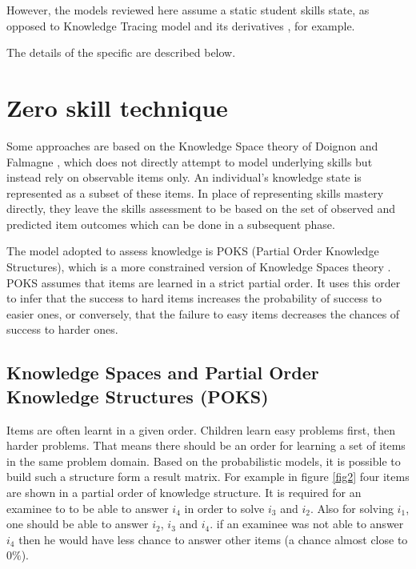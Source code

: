 However, the models reviewed here assume a static student skills state, as opposed to Knowledge Tracing model and its derivatives \citep{Koedinger2011}, for example.

The details of the specific are described below.



\section{Zero skill technique}

Some approaches are based on the Knowledge Space theory of Doignon and Falmagne \citep{Doignon1999,desmarais:umuai:2006}, which does not directly attempt to model underlying skills but instead rely on observable items only.  An individual's knowledge state is represented as a subset of these items. In place of representing skills mastery directly, they leave the skills assessment to be based on the set of observed and predicted item outcomes which can be done in a subsequent phase. 

The model adopted to assess knowledge is POKS (Partial Order Knowledge Structures), which is a more constrained version of Knowledge Spaces theory \citep{desmarais:umuai:1995}.  POKS assumes that items are learned in a strict partial order.  It uses this order to infer that the success to hard items increases the probability of success to easier ones, or conversely, that the failure to easy items decreases the chances of success to harder ones.


\subsection{Knowledge Spaces and Partial Order Knowledge Structures (POKS)}

Items are often learnt in a given order. Children learn easy problems first, then harder problems. That means there should be an order for learning a set of items in the same problem domain. Based on the probabilistic models, it is possible to build such a structure form a result matrix. For example in figure \ref{fig2} four items are shown in a partial order of knowledge structure. It is required for an examinee to to be able to answer $i_{4}$ in order to solve $i_{3}$ and $i_{2}$. Also for solving $i_{1}$, one should be able to answer $i_{2}$, $i_{3}$ and $i_{4}$. if an examinee was not able to answer $i_{4}$ then he would have less chance to answer other items (a chance almost close to $0\%$).

